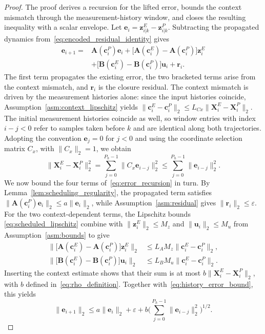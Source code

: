 \documentclass[journal]{IEEEtran}
\newcommand{\ve}{\mathbf{e}}
\newcommand{\vr}{\mathbf{r}}
\newcommand{\vu}{\mathbf{u}}
\newcommand{\vz}{\mathbf{z}}
\newcommand{\vc}{\mathbf{c}}
\newcommand{\mA}{\mathbf{A}}
\newcommand{\mB}{\mathbf{B}}
\newcommand{\mX}{\mathbf{X}}
\newcommand{\norm}[2][]{\mathopen{#1\lVert}#2\mathclose{#1\rVert}}
\theoremstyle{plain}
\theoremstyle{definition}
\theoremstyle{definition}
\begin{document}
\begin{proof}
The proof derives a recursion for the lifted error, bounds the
context mismatch through the measurement-history window, and closes
the resulting inequality with a scalar envelope. Let
$\ve_i=\vz_{i|k}^E-\vz_{i|k}^P$. Subtracting the propagated
dynamics from~\eqref{eq:encoded_residual_identity} gives
\begin{equation}
\begin{aligned}
\ve_{i+1}={}&\mA(\vc_i^P)\ve_i
+\big[\mA(\vc_i^E)-\mA(\vc_i^P)\big]\vz_i^E\\
&+\big[\mB(\vc_i^E)-\mB(\vc_i^P)\big]\vu_i+\vr_i.
\end{aligned}
\label{eq:error_recursion}
\end{equation}
The first term propagates the existing error, the two bracketed terms
arise from the context mismatch, and $\vr_i$ is the closure residual.
The context mismatch is driven by the measurement histories alone:
since the input histories coincide,
Assumption~\ref{asm:context_lipschitz} yields
$\norm{\vc_i^E-\vc_i^P}_2\le L_{Cx}\norm{\mX_i^E-\mX_i^P}_2$.
The initial measurement histories coincide as well, so window entries
with index $i-j<0$ refer to samples taken before $k$ and are identical
along both trajectories. Adopting the convention $\ve_j=0$ for $j<0$
and using the coordinate selection matrix $C_x$, with
$\norm{C_x}_2=1$, we obtain
\begin{equation}
\norm{\mX_i^E-\mX_i^P}_2^2
=\sum_{j=0}^{P_h-1}\norm{C_x\ve_{i-j}}_2^2
\le\sum_{j=0}^{P_h-1}\norm{\ve_{i-j}}_2^2.
\label{eq:history_error_bound}
\end{equation}
We now bound the four terms of~\eqref{eq:error_recursion} in turn.
By Lemma~\ref{lem:scheduling_regularity}, the propagated term satisfies
$\norm{\mA(\vc_i^P)\ve_i}_2\le a\norm{\ve_i}_2$, while
Assumption~\ref{asm:residual} gives $\norm{\vr_i}_2\le\varepsilon$.
For the two context-dependent terms, the Lipschitz bounds
\eqref{eq:scheduled_lipschitz} combine with
$\norm{\vz_i^E}_2\le M_z$ and $\norm{\vu_i}_2\le M_u$ from
Assumption~\ref{asm:bounds} to give
\begin{equation*}
\begin{aligned}
\norm[\big]{\big[\mA(\vc_i^E)-\mA(\vc_i^P)\big]\vz_i^E}_2
&\le L_AM_z\norm{\vc_i^E-\vc_i^P}_2,\\
\norm[\big]{\big[\mB(\vc_i^E)-\mB(\vc_i^P)\big]\vu_i}_2
&\le L_BM_u\norm{\vc_i^E-\vc_i^P}_2.
\end{aligned}
\end{equation*}
Inserting the context estimate shows that their sum is at most
$b\norm{\mX_i^E-\mX_i^P}_2$, with $b$ defined
in~\eqref{eq:rho_definition}. Together
with~\eqref{eq:history_error_bound}, this yields
\begin{equation}
\norm{\ve_{i+1}}_2\le a\norm{\ve_i}_2+\varepsilon
+b\Big(\sum_{j=0}^{P_h-1}\norm{\ve_{i-j}}_2^2\Big)^{1/2}.
\label{eq:error_inequality}
\end{equation}


\end{proof}
\end{document}
